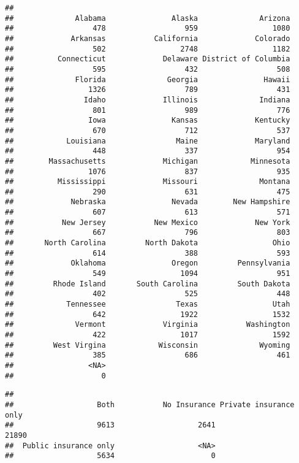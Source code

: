 \documentclass[
]{article}
\begin{document}
\begin{verbatim}
## 
##              Alabama               Alaska              Arizona 
##                  478                  959                 1080 
##             Arkansas           California             Colorado 
##                  502                 2748                 1182 
##          Connecticut             Delaware District of Columbia 
##                  595                  432                  508 
##              Florida              Georgia               Hawaii 
##                 1326                  789                  431 
##                Idaho             Illinois              Indiana 
##                  801                  989                  776 
##                 Iowa               Kansas             Kentucky 
##                  670                  712                  537 
##            Louisiana                Maine             Maryland 
##                  448                  337                  954 
##        Massachusetts             Michigan            Minnesota 
##                 1076                  837                  935 
##          Mississippi             Missouri              Montana 
##                  290                  631                  475 
##             Nebraska               Nevada        New Hampshire 
##                  607                  613                  571 
##           New Jersey           New Mexico             New York 
##                  667                  796                  803 
##       North Carolina         North Dakota                 Ohio 
##                  614                  388                  593 
##             Oklahoma               Oregon         Pennsylvania 
##                  549                 1094                  951 
##         Rhode Island       South Carolina         South Dakota 
##                  402                  525                  448 
##            Tennessee                Texas                 Utah 
##                  642                 1922                 1532 
##              Vermont             Virginia           Washington 
##                  422                 1017                 1592 
##         West Virgina            Wisconsin              Wyoming 
##                  385                  686                  461 
##                 <NA> 
##                    0
\end{verbatim}

\begin{verbatim}
## 
##                   Both           No Insurance Private insurance only 
##                   9613                   2641                  21890 
##  Public insurance only                   <NA> 
##                   5634                      0
\end{verbatim}
\end{document}

